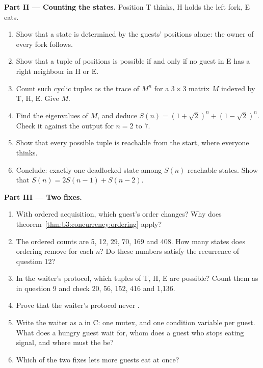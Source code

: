 \begin{problem}
\medskip\noindent\textbf{Part II --- Counting the states.} Position T thinks, H holds the left fork, E eats.
\begin{enumerate}[resume]
\item Show that a state is determined by the guests' positions alone: the owner of every fork follows.
\item Show that a tuple of positions is possible if and only if no guest in E has a right neighbour in H or E.
\item Count such cyclic tuples as the trace of $M^n$ for a $3 \times 3$ matrix $M$ indexed by T, H, E. Give $M$.
\item Find the eigenvalues of $M$, and deduce $S(n) = (1 + \sqrt{2})^n + (1 - \sqrt{2})^n$. Check it against the output for $n = 2$ to $7$.
\item Show that every possible tuple is reachable from the start, where everyone thinks.
\item Conclude: exactly one deadlocked state among $S(n)$ reachable states. Show that $S(n) = 2S(n - 1) + S(n - 2)$.
\end{enumerate}

\medskip\noindent\textbf{Part III --- Two fixes.}
\begin{enumerate}[resume]
\item With ordered acquisition, which guest's order changes? Why does theorem~\ref{thm:b3:concurrency:ordering} apply?
\item The ordered counts are 5, 12, 29, 70, 169 and 408. How many states does ordering remove for each $n$? Do these numbers satisfy the recurrence of question 12?
\item In the waiter's protocol, which tuples of T, H, E are possible? Count them as in question 9 and check 20, 56, 152, 416 and 1,136.
\item Prove that the waiter's protocol never .
\item Write the waiter as a  in C: one mutex, and one condition variable per guest. What does a hungry guest wait for, whom does a guest who stops eating signal, and where must the  be?
\item Which of the two fixes lets more guests eat at once?
\end{enumerate}


\end{problem}
